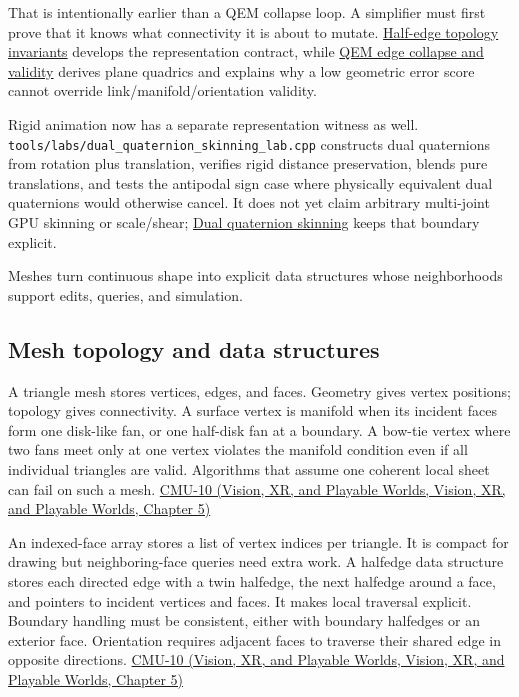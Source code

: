 That is intentionally earlier than a QEM collapse loop. A simplifier must first prove that it knows what connectivity it is about to mutate. \hyperref[appendix-faac749c9cdd]{Half-edge topology invariants} develops the representation contract, while \hyperref[appendix-89db9fe1bc8a]{QEM edge collapse and validity} derives plane quadrics and explains why a low geometric error score cannot override link/manifold/orientation validity.

Rigid animation now has a separate representation witness as well. \texttt{tools/labs/dual\_quaternion\_skinning\_lab.cpp} constructs dual quaternions from rotation plus translation, verifies rigid distance preservation, blends pure translations, and tests the antipodal sign case where physically equivalent dual quaternions would otherwise cancel. It does not yet claim arbitrary multi-joint GPU skinning or scale/shear; \hyperref[appendix-921f3f2efb53]{Dual quaternion skinning} keeps that boundary explicit.

Meshes turn continuous shape into explicit data structures whose neighborhoods support edits, queries, and simulation.

\subsection{Mesh topology and data structures}\label{03-visual-computing-i-ch002-mesh-topology-and-data-structures}

A triangle mesh stores vertices, edges, and faces. Geometry gives vertex positions; topology gives connectivity. A surface vertex is manifold when its incident faces form one disk-like fan, or one half-disk fan at a boundary. A bow-tie vertex where two fans meet only at one vertex violates the manifold condition even if all individual triangles are valid. Algorithms that assume one coherent local sheet can fail on such a mesh. \href{../07-Vision-XR-and-Playable-Worlds/main.pdf\#nameddest=04-visual-computing-ii-ch036-cmu-10---meshes-and-manifolds}{CMU-10 (Vision, XR, and Playable Worlds, Vision, XR, and Playable Worlds, Chapter 5)}

An indexed-face array stores a list of vertex indices per triangle. It is compact for drawing but neighboring-face queries need extra work. A halfedge data structure stores each directed edge with a twin halfedge, the next halfedge around a face, and pointers to incident vertices and faces. It makes local traversal explicit. Boundary handling must be consistent, either with boundary halfedges or an exterior face. Orientation requires adjacent faces to traverse their shared edge in opposite directions. \href{../07-Vision-XR-and-Playable-Worlds/main.pdf\#nameddest=04-visual-computing-ii-ch036-cmu-10---meshes-and-manifolds}{CMU-10 (Vision, XR, and Playable Worlds, Vision, XR, and Playable Worlds, Chapter 5)}

